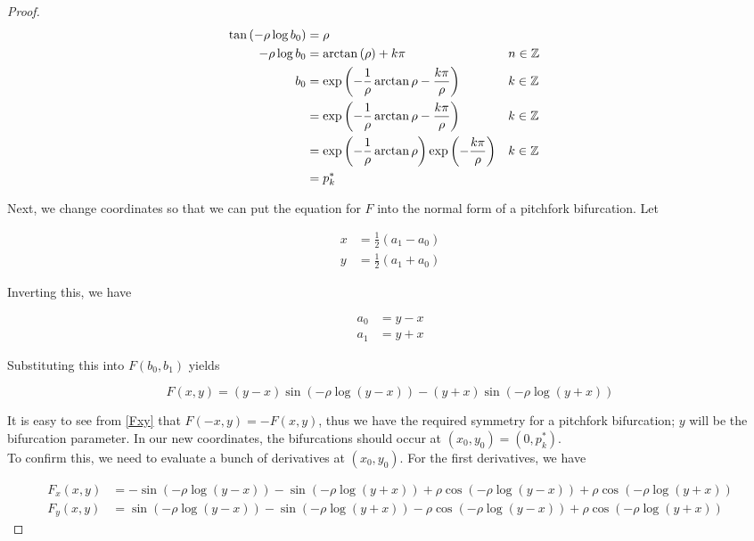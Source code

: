 \documentclass[thesis.tex]{subfiles}
\begin{document}
\begin{lemma}
\begin{proof}
\begin{align*}
\tan \left( -\rho \log b_0 \right) &=  \rho \\
-\rho \log b_0 &= \arctan \left( \rho\right) + k \pi && n \in {\mathbb Z} \\ 
b_0 &= \exp \left( -\frac{1}{\rho} \arctan \rho - \frac{k \pi}{\rho} \right) && k \in {\mathbb Z} \\
&= \exp \left( -\frac{1}{\rho} \arctan \rho - \frac{k \pi}{\rho} \right) && k \in {\mathbb Z} \\
&= \exp \left( -\frac{1}{\rho} \arctan \rho \right) \exp \left( - \frac{k \pi}{\rho} \right) && k \in {\mathbb Z} \\
&= p_k^*
\end{align*}

Next, we change coordinates so that we can put the equation for $F$ into the normal form of a pitchfork bifurcation. Let 

\begin{align*}
x &= \frac{1}{2}(a_1 - a_0) \\
y &= \frac{1}{2}(a_1 + a_0)
\end{align*}

Inverting this, we have

\begin{align*}
a_0 &= y - x \\
a_1 &= y + x
\end{align*}

Substituting this into $F(b_0, b_1)$ yields

\begin{equation}\label{Fxy}
F(x, y) = 
(y - x) \sin \left( -\rho \log(y - x) \right) - (y + x) \sin \left( - \rho \log (y + x) \right)
\end{equation}

It is easy to see from \eqref{Fxy} that $F(-x, y) = -F(x, y)$, thus we have the required symmetry for a pitchfork bifurcation; $y$ will be the bifurcation parameter. In our new coordinates, the bifurcations should occur at $(x_0, y_0) = \left(0, p^*_k \right)$.\\

To confirm this, we need to evaluate a bunch of derivatives at $(x_0, y_0)$. For the first derivatives, we have

\begin{align*}
F_x(x, y) &= -\sin \left( - \rho \log(y - x) \right) - 
\sin \left( - \rho \log(y + x) \right)
+\rho \cos \left( - \rho \log(y - x) \right) + \rho \cos \left( - \rho \log(y + x) \right) \\
F_y(x, y) &= \sin \left( - \rho \log(y - x) \right) - 
\sin \left( - \rho \log(y + x) \right)
-\rho \cos \left( - \rho \log(y - x) \right) + \rho \cos \left( - \rho \log(y + x) \right)
\end{align*}


\end{proof}
\end{lemma}
\end{document}
